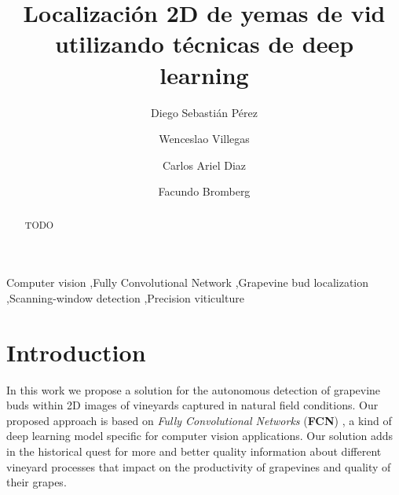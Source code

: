 \documentclass[a4paper,authoryear,review]{elsarticle}
\begin{document}
\begin{frontmatter}

\title{Localización 2D de yemas de vid utilizando técnicas de deep learning}

\author[utn,uncuyo]{Diego Sebastián Pérez}

\author[utn]{Wenceslao Villegas}

\author[utn]{Carlos Ariel Diaz}

\author[conicet]{Facundo Bromberg}

\address[utn]{Universidad Tecnológica Nacional, Facultad Regional Mendoza, Laboratorio de Inteligencia Artificial DHARMa, Dpto. de Sistemas de la Información. Rodríguez 273, CP 5500, Mendoza, Argentina.}

\address[uncuyo]{Universidad Nacional de Cuyo, Instituto universitario para las Tecnologías de la Información y las Comunicaciones, CONICET. Padre Jorge Contreras 1300, CP 5500, Mendoza, Argentina.}

\address[conicet]{Universidad Tecnológica Nacional, Facultad Regional Mendoza, CONICET, Laboratorio de Inteligencia Artificial DHARMa, Dpto. de Sistemas de la Información. Rodríguez 273, CP 5500, Mendoza, Argentina.}


\begin{abstract}
TODO
\end{abstract}

\begin{keyword}
Computer vision \sep Fully Convolutional Network \sep Grapevine bud localization \sep Scanning-window detection \sep Precision viticulture
\end{keyword}

\end{frontmatter}

\linenumbers

\section{Introduction} 

In this work we propose a solution for the autonomous detection of grapevine buds within 2D images of vineyards captured in natural field conditions. Our proposed approach is based on \emph{Fully Convolutional Networks} (\textbf{FCN}) \citep{long2015fully, shelhamer2017fully}, a kind of deep learning model specific for computer vision applications. Our solution adds in the historical quest for more and better quality information about different vineyard processes that impact on the productivity of grapevines and quality of their grapes. 
\end{document}
